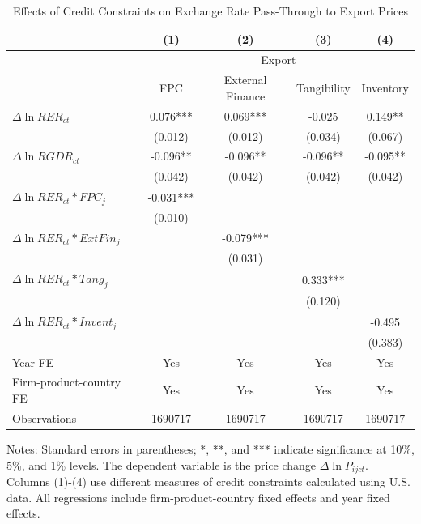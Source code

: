 \documentclass[12pt]{article}
\begin{document}
\begin{table}[htbp]
	\centering
	\caption{Effects of Credit Constraints on Exchange Rate Pass-Through to Export Prices}
	\begin{threeparttable}	
		\begin{tabular}{lcccc}
			\toprule
			& (1)   & (2)   & (3)   & (4) \\
			\midrule
			 & \multicolumn{4}{c}{Export} \\
			& FPC   & External Finance & Tangibility & Inventory \\
			\midrule
			$\Delta \ln RER_{ct}$ & 0.076*** & 0.069*** & -0.025 & 0.149** \\
			& (0.012) & (0.012) & (0.034) & (0.067) \\
			$\Delta \ln RGDR_{ct}$ & -0.096** & -0.096** & -0.096** & -0.095** \\
			& (0.042) & (0.042) & (0.042) & (0.042) \\
			$\Delta \ln RER_{ct}*FPC_{j}$ & -0.031*** &       &       &  \\
			& (0.010) &       &       &  \\
			$\Delta \ln RER_{ct}*ExtFin_{j}$ &       & -0.079*** &       &  \\
			&       & (0.031) &       &  \\
			$\Delta \ln RER_{ct}*Tang_{j}$ &       &       & 0.333*** &  \\
			&       &       & (0.120) &  \\
			$\Delta \ln RER_{ct}*Invent_{j}$ &       &       &       & -0.495 \\
			&       &       &       & (0.383) \\
			Year FE  & Yes   & Yes   & Yes   & Yes \\
			Firm-product-country FE & Yes   & Yes   & Yes   & Yes \\
			Observations & 1690717 & 1690717 & 1690717 & 1690717 \\
			\bottomrule
		\end{tabular}
		\begin{tablenotes}
			\footnotesize
			\item[Notes:] Standard errors in parentheses; *, **, and *** indicate significance at 10\%, 5\%, and 1\% levels. The dependent variable is the price change $\Delta \ln P_{ijct}$. Columns (1)-(4) use different measures of credit constraints calculated using U.S. data. All regressions include firm-product-country fixed effects and year fixed effects.
		\end{tablenotes}
	\end{threeparttable}
	\label{tab.credit.exp}
\end{table}
\end{document}
